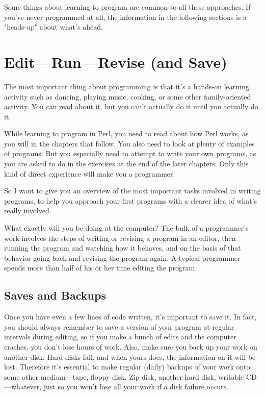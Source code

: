 Some things about learning to program are common to all these approaches. If you've never programmed at all, the information in the following sections is a "heads-up" about what's ahead. 

\section{Edit—Run—Revise (and Save)}
The most important thing about programming is that it's a hands-on learning activity such as dancing, playing music, cooking, or some other family-oriented activity. You can read about it, but you can't actually do it until you actually do it.

While learning to program in Perl, you need to read about how Perl works, as you will in the chapters that follow. You also need to look at plenty of examples of programs. But you especially need to attempt to write your own programs, as you are asked to do in the exercises at the end of the later chapters. Only this kind of direct experience will make you a programmer.

So I want to give you an overview of the most important tasks involved in writing programs, to help you approach your first programs with a clearer idea of what's really involved.

What exactly will you be doing at the computer? The bulk of a programmer's work involves the steps of writing or revising a program in an editor, then running the program and watching how it behaves, and on the basis of that behavior going back and revising the program again. A typical programmer spends more than half of his or her time editing the program.

\subsection{Saves and Backups}
Once you have even a few lines of code written, it's important to save it. In fact, you should always remember to save a version of your program at regular intervals during editing, so if you make a bunch of edits and the computer crashes, you don't lose hours of work. Also, make sure you back up your work on another disk. Hard disks fail, and when yours does, the information on it will be lost. Therefore it's essential to make regular (daily) backups of your work onto some other medium—tape, floppy disk, Zip disk, another hard disk, writable CD—whatever, just so you won't lose all your work if a disk failure occurs.

